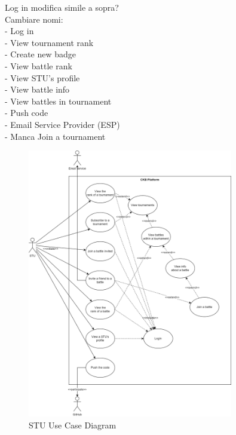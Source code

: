 {\color{red} 
        Log in modifica simile a sopra?\\
        Cambiare nomi: \\
        - Log in \\
        - View tournament rank \\
        - Create new badge \\
        - View battle rank \\
        - View STU's profile \\
        - View battle info \\
        - View battles in tournament \\ 
        - Push code \\
        - Email Service Provider (ESP) \\
        - Manca Join a tournament
}
\begin{figure}[H]
    \centering
    \includegraphics[width=0.8\textwidth]{images/sequence_diagrams/use_case_diagrams_STU.png}
    \caption{STU Use Case Diagram}
\end{figure}

